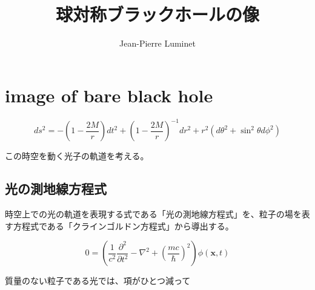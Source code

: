 \documentclass[dvipdfmx]{report} %
\title{球対称ブラックホールの像}
\author{Jean-Pierre Luminet}
\date{}
\begin{document}
\maketitle %

\section{image of bare black hole}
\begin{tcolorbox}[title=シュバルツシルト時空]
	\[
	ds^2 = - \left( 1 - \frac{2M}{r} \right) dt^2 + \left( 1 - \frac{2M}{r} \right)^{-1} dr^2 + r^2 (d\theta^2 + \sin^2 \theta d\phi^2)
	\]
\end{tcolorbox}
この時空を動く光子の軌道を考える。

\subsection{光の測地線方程式}
時空上での光の軌道を表現する式である「光の測地線方程式」を、粒子の場を表す方程式である「クラインゴルドン方程式」から導出する。

\begin{tcolorbox}[title=クラインゴルドン方程式]
	\[
	0 = \left( \frac{1}{c^2}\frac{\partial^2}{\partial t^2} - \nabla^2 + \left( \frac{mc}{\hbar} \right)^2 \right) \phi(\bm{x}, t)
	\]
\end{tcolorbox}
質量のない粒子である光では、項がひとつ減って
\end{document}
